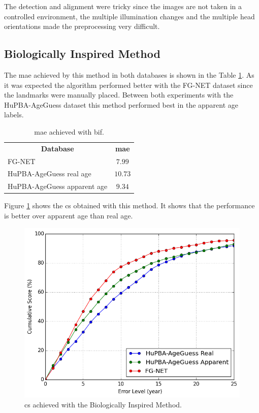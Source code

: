 The detection and alignment were tricky since the images are not taken in a controlled environment, the multiple illumination changes and the multiple head orientations made the preprocessing very difficult.

\subsection{Biologically Inspired Method}

The \gls{mae} achieved by this method in both databases is shown in the Table \ref{tab:BIFresults}. As it was expected the algorithm performed better with the FG-NET dataset since the landmarks were manually placed. Between both experiments with the HuPBA-AgeGuess dataset this method performed best in the apparent age labels.

\begin{table}[!h]
	\centering
	\begin{tabular}{|l||c|}
		\hline
		\multicolumn{1}{|c||}{\textbf{Database}} & \textbf{\gls{mae}}\\ \hhline{=#=}
		FG-NET & $7.99$\\ 		\hline
		HuPBA-AgeGuess real age & $10.73$\\ \hline
		HuPBA-AgeGuess apparent age & $9.34$\\ \hline
			
	\end{tabular}
	\caption{\gls{mae} achieved with \gls{bif}.}
	\label{tab:BIFresults}
\end{table}

Figure \ref{fig:cumS_BIF} shows the \gls{cs} obtained with this method. It shows that the performance is better over apparent age than real age.

\begin{figure}[!h]
	\centering
	\includegraphics[width=\textwidth]{figures/cum_score}
	\caption{\gls{cs} achieved with the Biologically Inspired Method.}
	\label{fig:cumS_BIF}
\end{figure}

